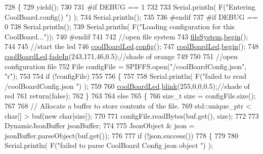 \begin{DoxyCode}
728 \{
729     yield();
730 
731 \textcolor{preprocessor}{#if DEBUG == 1}
732 
733     Serial.println( F(\textcolor{stringliteral}{"Entering CoolBoard.config() "}) );
734     Serial.println();
735 
736 \textcolor{preprocessor}{#endif}
737 \textcolor{preprocessor}{#if DEBUG == 0}
738     Serial.println();
739     Serial.println( F(\textcolor{stringliteral}{"Loading configuration for this CoolBoard..."}));
740 \textcolor{preprocessor}{#endif }
741 
742     \textcolor{comment}{//open file system}
743     \hyperlink{class_cool_board_a42c2586fbb13ff7f06538e9284e8538d}{fileSystem}.\hyperlink{class_cool_file_system_a6ba6f666ed4c530174f8569d2c636748}{begin}();
744     
745     \textcolor{comment}{//start the led}
746     \hyperlink{class_cool_board_a1b1d3c684a5baa56b08486e192fd8e97}{coolBoardLed}.\hyperlink{class_cool_board_led_a1b60e5e30bea96c49ed62ed1bf1ffc8b}{config}();
747     \hyperlink{class_cool_board_a1b1d3c684a5baa56b08486e192fd8e97}{coolBoardLed}.\hyperlink{class_cool_board_led_ae3cbde8affcc6f011cbd698c8ef911f6}{begin}();
748     \hyperlink{class_cool_board_a1b1d3c684a5baa56b08486e192fd8e97}{coolBoardLed}.\hyperlink{class_cool_board_led_ab778f5e7bed0ab74e3906d82110493c3}{fadeIn}(243,171,46,0.5);\textcolor{comment}{//shade of orange     }
749 
750     
751     \textcolor{comment}{//open configuration file}
752     File configFile = SPIFFS.open(\textcolor{stringliteral}{"/coolBoardConfig.json"}, \textcolor{stringliteral}{"r"});
753     
754     \textcolor{keywordflow}{if} (!configFile)
755 
756     \{
757     
758         Serial.println( F(\textcolor{stringliteral}{"failed to read /coolBoardConfig.json  "}) );
759 
760         \hyperlink{class_cool_board_a1b1d3c684a5baa56b08486e192fd8e97}{coolBoardLed}.\hyperlink{class_cool_board_led_a96e1ea13003eee34c9dbcef340404426}{blink}(255,0,0,0.5);\textcolor{comment}{//shade of red     }
761         \textcolor{keywordflow}{return}(\textcolor{keyword}{false});
762     \}
763 
764     \textcolor{keywordflow}{else}
765     \{
766         \textcolor{keywordtype}{size\_t} size = configFile.size();
767 
768         \textcolor{comment}{// Allocate a buffer to store contents of the file.}
769         std::unique\_ptr < char[] > buf(\textcolor{keyword}{new} \textcolor{keywordtype}{char}[size]);
770 
771         configFile.readBytes(buf.get(), size);
772 
773         DynamicJsonBuffer jsonBuffer;
774 
775         JsonObject & json = jsonBuffer.parseObject(buf.get());
776 
777         \textcolor{keywordflow}{if} (!json.success())
778         \{
779         
780             Serial.println( F(\textcolor{stringliteral}{"failed to parse CoolBoard Config json object "}) );

\end{DoxyCode}
